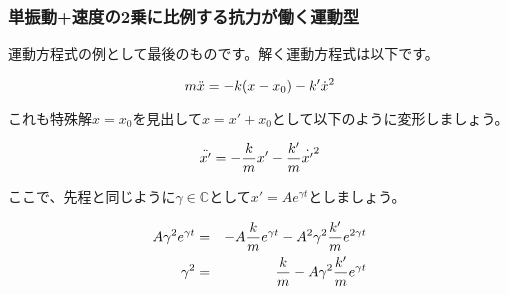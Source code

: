 \subsubsection{単振動+速度の2乗に比例する抗力が働く運動型}
\label{vibration+vel_2}
運動方程式の例として最後のものです。解く運動方程式は以下です。

\begin{equation}
    m\ddot{x} = -k(x-x_0) - k'\dot{x}^2 \notag
\end{equation}

これも特殊解$x=x_0$を見出して$x=x'+x_0$として以下のように変形しましょう。

\begin{equation}
    \ddot{x'} = -\frac{k}{m}x' - \frac{k'}{m}\dot{x'}^2 \notag
\end{equation}

ここで、先程と同じように$\gamma\in\mathbb{C}$として$x'=Ae^{\gamma t}$としましょう。

\begin{eqnarray}
    A\gamma^2e^{\gamma t} &=& -A\frac{k}{m}e^{\gamma t} - A^2\gamma^2\frac{k'}{m}e^{2\gamma t} \notag \\
    \gamma^2 &=& \frac{k}{m} - A\gamma^2\frac{k'}{m}e^{\gamma t} \notag
\end{eqnarray}
\fi